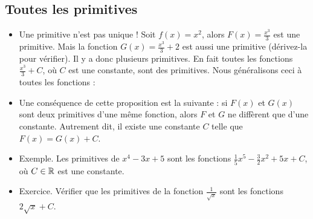 \documentclass[11pt,class=report,crop=false]{standalone}
\begin{document}
%
%
%
%
%
%  
%


\subsection*{Toutes les primitives}

\begin{itemize}
   \item Une primitive n'est pas unique ! Soit $f(x)=x^2$, alors $F(x)=\displaystyle\frac{x^3}{3}$ est une primitive. Mais la fonction $G(x) = \displaystyle\frac{x^3}{3} + 2$ est aussi une primitive (dérivez-la pour vérifier). Il y a donc plusieurs primitives. En fait toutes les fonctions $\displaystyle\frac{x^3}{3} + C$, où $C$ est une constante, sont des primitives. Nous généralisons ceci à toutes les fonctions :

  
  \item Une conséquence de cette proposition est la suivante : si $F(x)$ et $G(x)$ sont deux primitives d'une même fonction, alors $F$ et $G$ ne diffèrent que d'une constante. Autrement dit, il existe une constante $C$ telle que $F(x) = G(x) + C$.

  \item Exemple. Les primitives de $x^4-3x+5$ sont les fonctions
$\frac{1}{5}x^5 - \frac{3}{2}x^2+5x + C$, où $C\in\mathbb{R}$ est une constante.

  \item Exercice. Vérifier que les primitives de la fonction $\frac{1}{\sqrt{x}}$ sont les fonctions $2\sqrt{x} +C$.

\end{itemize}
\end{document}
